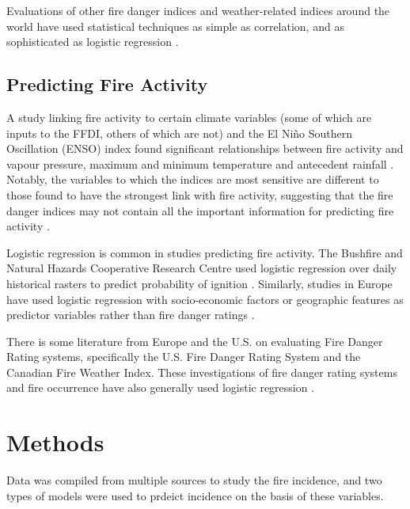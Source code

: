 \documentclass[11pt,a4paper]{article}
\begin{document}
Evaluations of other fire danger indices and weather-related indices around the world have used statistical techniques as simple as correlation, and as sophisticated as logistic regression \citep{andrews03,harris14}.


\subsection{Predicting Fire Activity}

A study linking fire activity to certain climate variables (some of which are inputs to the FFDI, others of which are not) and the El Niño Southern Oscillation (ENSO) index found significant relationships between fire activity and vapour pressure, maximum and minimum temperature and antecedent rainfall \citep{harris14}. Notably, the variables to which the indices are most sensitive are different to those found to have the strongest link with fire activity, suggesting that the fire danger indices may not contain all the important information for predicting fire activity \citep{harris14}.

Logistic regression is common in studies predicting fire activity. The Bushfire and Natural Hazards Cooperative Research Centre used logistic regression over daily historical rasters to predict probability of ignition \citep{Read2015-hn}. Similarly, studies in Europe have used logistic regression with socio-economic factors or geographic features as predictor variables rather than fire danger ratings \citep{del11, zhang13}.

There is some literature from Europe and the U.S. on evaluating Fire Danger Rating systems, specifically the U.S. Fire Danger Rating System and the Canadian Fire Weather Index.  These investigations of fire danger rating systems and fire occurrence have also  generally used logistic regression \citep{andrews03, padilla11}.

\section{Methods}

Data was compiled from multiple sources to study the fire incidence, and two types of models were used to prdeict incidence on the basis of these variables.
\end{document}
